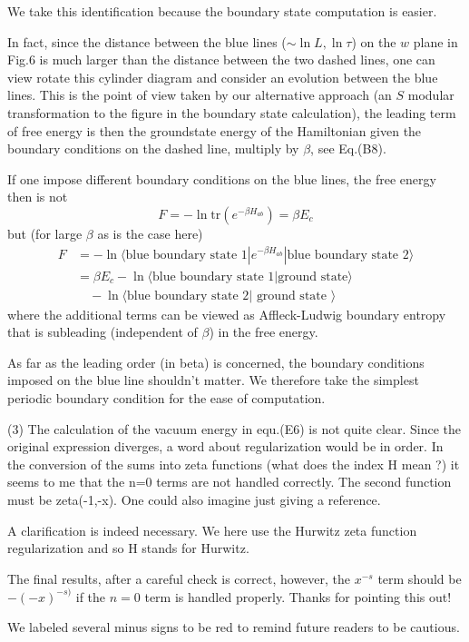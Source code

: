 \documentclass{article}
\newcommand{\reply}[1]{{\color{black}#1}}
\begin{document}
\reply{We take this identification because the boundary state computation is easier. 

In fact, since the distance between the blue lines ($\sim \ln L , \ln \tau$) on the $w$ plane in Fig.6 is much larger than the distance between the two dashed lines, one can view rotate this cylinder diagram and consider an evolution between the blue lines. This is the point of view taken by our alternative approach (an $S$ modular transformation to the figure in the boundary state calculation), the leading term of free energy is then the groundstate energy of the Hamiltonian given the boundary conditions on the dashed line, multiply by $\beta$, see Eq.(B8). 

If one impose different boundary conditions on the blue lines, the free energy then is not 
\begin{equation}
F = - \ln \text{tr}( e^{ - \beta H_{ab} } ) =  \beta  E_c
\end{equation}
but (for large $\beta$ as is the case here)
\begin{equation}
\begin{aligned}
F &= - \ln \langle \text{blue boundary state 1} | e^{ - \beta H_{ab}} | \text{blue boundary state 2} \rangle \\
&= \beta  E_c - \ln \langle \text{blue boundary state 1} | \text{ground state} \rangle \\
 &\quad - \ln \langle \text{blue boundary state 2} |\text{ ground state }\rangle                                                                                 
\end{aligned}
\end{equation}
where the additional terms can be viewed as Affleck-Ludwig boundary entropy that is subleading (independent of $\beta$) in the free energy. 

As far as the leading order (in beta) is concerned, the boundary conditions imposed on the blue line shouldn’t matter. We therefore take the simplest periodic boundary condition for the ease of computation. }

(3) The calculation of the vacuum energy in equ.(E6) is not quite clear. Since the original expression diverges, a word about regularization would be in order. In the conversion of the sums into zeta functions (what does the index H mean ?) it seems to me that the n=0 terms are not handled correctly. The second function must be zeta(-1,-x). One could also imagine just giving a reference. 

\reply{
A clarification is indeed necessary. We here use the Hurwitz zeta function regularization and so H stands for Hurwitz. 

The final results, after a careful check is correct, however, the $x^{-s}$ term should be $-(-x)^{-s)}$ if the $n = 0$ term is handled properly. Thanks for pointing this out!

We labeled several minus signs to be red to remind future readers to be cautious. }
\end{document}
